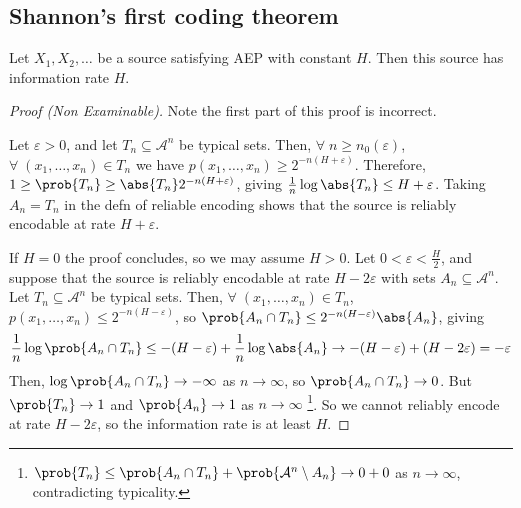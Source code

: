 \subsection{Shannon's first coding theorem}
\begin{theorem}
    Let $X_1, X_2, \dots$ be a source satisfying AEP with constant $H$.
    Then this source has information rate $H$.
\end{theorem}

\begin{proof}[Proof (Non Examinable)]

    Note the first part of this proof is incorrect.

    Let $\varepsilon > 0$, and let $T_n \subseteq \mathcal A^n$ be typical sets.
    Then, $\forall \; n \geq n_0(\varepsilon)$, $\forall \; (x_1, \dots, x_n) \in T_n$ we have $p(x_1, \dots, x_n) \geq 2^{-n(H + \varepsilon)}$.
    Therefore, $1 \geq \prob{T_n} \geq \abs{T_n} 2^{-n(H + \varepsilon)}$, giving $\frac{1}{n} \log \abs{T_n} \leq H + \varepsilon$.
    Taking $A_n = T_n$ in the defn of reliable encoding shows that the source is reliably encodable at rate $H + \varepsilon$.

    If $H = 0$ the proof concludes, so we may assume $H > 0$.
    Let $0 < \varepsilon < \frac{H}{2}$, and suppose that the source is reliably encodable at rate $H - 2\varepsilon$ with sets $A_n \subseteq \mathcal A^n$.
    Let $T_n \subseteq \mathcal A^n$ be typical sets.
    Then, $\forall \; (x_1, \dots, x_n) \in T_n$, $p(x_1, \dots, x_n) \leq 2^{-n(H - \varepsilon)}$, so $\prob{A_n \cap T_n} \leq 2^{-n(H - \varepsilon)} \abs{A_n}$, giving
    \begin{align*}
        \frac{1}{n} \log \prob{A_n \cap T_n} \leq -(H - \varepsilon) + \frac{1}{n} \log \abs{A_n} \to -(H - \varepsilon) + (H - 2 \varepsilon) = -\varepsilon
    \end{align*}
    Then, $\log \prob{A_n \cap T_n} \to -\infty$ as $n \to \infty$, so $\prob{A_n \cap T_n} \to 0$.
    But $\prob{T_n} \to 1$ and $\prob{A_n} \to 1$ as $n \to \infty$ \Lightning\footnote{$\prob{T_n} \leq \prob{A_n \cap T_n} + \prob{\mathcal A^n \setminus A_n} \to 0 + 0$ as $n \to \infty$, contradicting typicality.}.
    So we cannot reliably encode at rate $H - 2\varepsilon$, so the information rate is at least $H$.
\end{proof}

